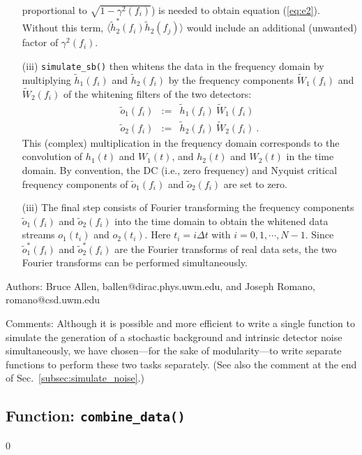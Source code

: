 \begin{itemize}
proportional to $\sqrt{1-\gamma^2(f_i)}$) is needed to obtain equation
(\ref{eq:e2}).
Without this term, $\langle\tilde h_2^*(f_i)\tilde h_2(f_j)\rangle$ would
include an additional (unwanted) factor of $\gamma^2(f_i)$.
%
\item[(iii)] {\tt simulate\_sb()} then whitens the data
in the frequency domain by multiplying
$\tilde h_1(f_i)$ and $\tilde h_2(f_i)$ by the frequency components
$\tilde W_1(f_i)$ and $\tilde W_2(f_i)$ of the whitening filters
of the two detectors:
%
\begin{eqnarray}
\tilde o_1(f_i)&:=&\tilde h_1(f_i)\ \tilde W_1(f_i)\\
\tilde o_2(f_i)&:=&\tilde h_2(f_i)\ \tilde W_2(f_i)\ .
\end{eqnarray}
%
This (complex) multiplication in the frequency domain corresponds
to the convolution of $h_1(t)$ and $W_1(t)$, and $h_2(t)$ and $W_2(t)$
in the time domain.
By convention, the DC (i.e., zero frequency) and Nyquist critical
frequency components of $\tilde o_1(f_i)$ and $\tilde o_2(f_i)$
are set to zero.
%
\item[(iii)] The final step consists of Fourier transforming the
frequency components $\tilde o_1(f_i)$ and $\tilde o_2(f_i)$ into the 
time domain to obtain the whitened data streams
$o_1(t_i)$ and $o_2(t_i)$.
Here $t_i=i\Delta t$ with $i=0,1,\cdots,N-1$.
Since $\tilde o_1^*(f_i)$ and $\tilde o_2^*(f_i)$ are the Fourier
transforms of real data sets, the two Fourier transforms can be 
performed simultaneously.
\end{itemize}
%
\begin{description}
\item{Authors:}
Bruce Allen, ballen@dirac.phys.uwm.edu, and Joseph Romano, romano@csd.uwm.edu
\item{Comments:}
Although it is possible and more efficient to write a single function to 
simulate the generation of a stochastic background and intrinsic detector 
noise simultaneously, we have chosen---for the sake of modularity---to 
write separate functions to perform these two tasks separately.
(See also the comment at the end of Sec.~\ref{subsec:simulate_noise}.)
\end{description}
\clearpage

\subsection{Function: {\tt combine\_data()}}
\label{subsec:combine_data}
\setcounter{equation}0

